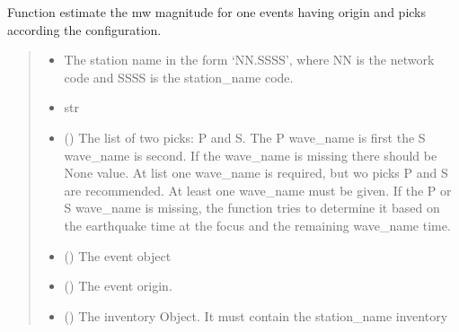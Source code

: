 \documentclass[letterpaper,10pt,english]{sphinxmanual}
\begin{document}
\begin{fulllineitems}
\label{\detokenize{api_main:amw.mw.spectral_mw.station_moment_magnitude}}
\pysigstartsignatures
{}
\pysigstopsignatures
\sphinxAtStartPar
Function estimate the mw magnitude for one events having origin and picks
according the configuration.
\begin{quote}\begin{description}
\begin{itemize}
\item {} 
\sphinxAtStartPar
{} \textendash{} The station name in the form ‘NN.SSSS’, where NN is the network code and SSSS is the station\_name code.

\item {} 
\sphinxAtStartPar
{} \textendash{} str

\item {} 
\sphinxAtStartPar
{} () \textendash{} The list of two picks: P and S. The P wave\_name is first the S wave\_name is second.
If the wave\_name is missing there should be None value. At list one wave\_name is required,
but wo picks P and S are recommended. At least one wave\_name must be given. If the P or S wave\_name is missing,
the function tries to determine it based on the earthquake time at the focus and the remaining wave\_name time.

\item {} 
\sphinxAtStartPar
{} () \textendash{} The event object

\item {} 
\sphinxAtStartPar
{} () \textendash{} The event origin.

\item {} 
\sphinxAtStartPar
{} () \textendash{} The inventory Object. It must contain the station\_name inventory


\end{itemize}
\end{description}
\end{quote}
\end{fulllineitems}
\end{document}
